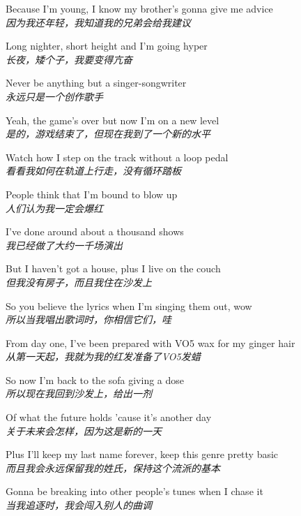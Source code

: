 \begin{spacing}{1.5}
\begin{flushleft}
Because I'm young, I know my brother's gonna give me advice\\
\textit{因为我还年轻，我知道我的兄弟会给我建议}\lyricspace

Long nighter, short height and I'm going hyper\\
\textit{长夜，矮个子，我要变得亢奋}\lyricspace

Never be anything but a singer-songwriter\\
\textit{永远只是一个创作歌手}\lyricspace

Yeah, the game's over but now I'm on a new level\\
\textit{是的，游戏结束了，但现在我到了一个新的水平}\lyricspace

Watch how I step on the track without a loop pedal\\
\textit{看看我如何在轨道上行走，没有循环踏板}\lyricspace

People think that I'm bound to blow up\\
\textit{人们认为我一定会爆红}\lyricspace

I've done around about a thousand shows\\
\textit{我已经做了大约一千场演出}\lyricspace

But I haven't got a house, plus I live on the couch\\
\textit{但我没有房子，而且我住在沙发上}\lyricspace

So you believe the lyrics when I'm singing them out, wow\\
\textit{所以当我唱出歌词时，你相信它们，哇}\lyricspace

From day one, I've been prepared with VO5 wax for my ginger hair\\
\textit{从第一天起，我就为我的红发准备了VO5发蜡}\lyricspace

So now I'm back to the sofa giving a dose\\
\textit{所以现在我回到沙发上，给出一剂}\lyricspace

Of what the future holds 'cause it's another day\\
\textit{关于未来会怎样，因为这是新的一天}\lyricspace

Plus I'll keep my last name forever, keep this genre pretty basic\\
\textit{而且我会永远保留我的姓氏，保持这个流派的基本}\lyricspace

Gonna be breaking into other people's tunes when I chase it\\
\textit{当我追逐时，我会闯入别人的曲调}\lyricspace


\end{flushleft}
\end{spacing}
